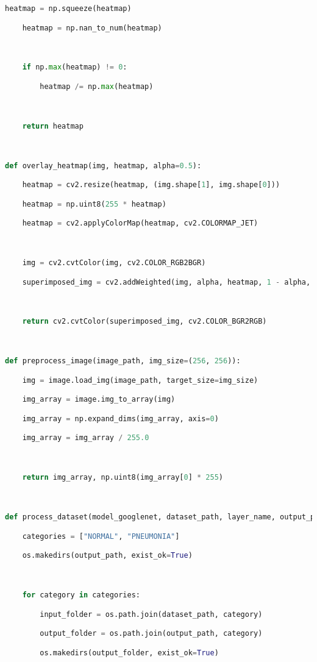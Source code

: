 \documentclass{article}
\begin{document}
\begin{lstlisting}[style=mystyle,language=Python]
    heatmap = np.squeeze(heatmap)

    heatmap = np.nan_to_num(heatmap)



    if np.max(heatmap) != 0:

        heatmap /= np.max(heatmap)



    return heatmap



def overlay_heatmap(img, heatmap, alpha=0.5):

    heatmap = cv2.resize(heatmap, (img.shape[1], img.shape[0]))

    heatmap = np.uint8(255 * heatmap)

    heatmap = cv2.applyColorMap(heatmap, cv2.COLORMAP_JET)



    img = cv2.cvtColor(img, cv2.COLOR_RGB2BGR)

    superimposed_img = cv2.addWeighted(img, alpha, heatmap, 1 - alpha, 0)



    return cv2.cvtColor(superimposed_img, cv2.COLOR_BGR2RGB)



def preprocess_image(image_path, img_size=(256, 256)):

    img = image.load_img(image_path, target_size=img_size)

    img_array = image.img_to_array(img)

    img_array = np.expand_dims(img_array, axis=0)

    img_array = img_array / 255.0



    return img_array, np.uint8(img_array[0] * 255)



def process_dataset(model_googlenet, dataset_path, layer_name, output_path):

    categories = ["NORMAL", "PNEUMONIA"]

    os.makedirs(output_path, exist_ok=True)



    for category in categories:

        input_folder = os.path.join(dataset_path, category)

        output_folder = os.path.join(output_path, category)

        os.makedirs(output_folder, exist_ok=True)




\end{lstlisting}
\end{document}
